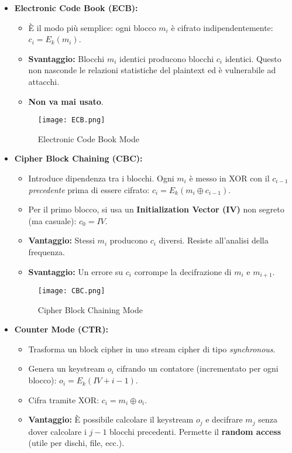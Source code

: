\documentclass[../main.tex]{subfiles}
\begin{document}
\begin{itemize}
    \item \textbf{Electronic Code Book (ECB):}
          \begin{itemize}
              \item È il modo più semplice: ogni blocco $m_i$ è cifrato indipendentemente: $c_i = E_k(m_i)$.
              \item \textbf{Svantaggio:} Blocchi $m_i$ identici producono blocchi $c_i$ identici. Questo non nasconde le relazioni statistiche del plaintext ed è vulnerabile ad attacchi.
              \item \textbf{Non va mai usato}.
          \end{itemize}
          
    \begin{figure}[H]
      \centering
      \texttt{[image: ECB.png]}
      \caption{Electronic Code Book Mode}
      \label{fig:etichetta}
    \end{figure}
     
    \item \textbf{Cipher Block Chaining (CBC):}
          \begin{itemize}
              \item Introduce dipendenza tra i blocchi. Ogni $m_i$ è messo in XOR con il $c_{i-1}$ \emph{precedente} prima di essere cifrato: $c_i = E_k(m_i \oplus c_{i-1})$.
              \item Per il primo blocco, si usa un \textbf{Initialization Vector (IV)} non segreto (ma casuale): $c_0 = IV$.
              \item \textbf{Vantaggio:} Stessi $m_i$ producono $c_i$ diversi. Resiste all'analisi della frequenza.
              \item \textbf{Svantaggio:} Un errore su $c_i$ corrompe la decifrazione di $m_i$ e $m_{i+1}$.
          \end{itemize}
          
    \begin{figure}[H]
      \centering
      \texttt{[image: CBC.png]}
      \caption{Cipher Block Chaining Mode}
      \label{fig:etichetta}
    \end{figure}
          
    \item \textbf{Counter Mode (CTR):}
          \begin{itemize}
              \item Trasforma un block cipher in uno stream cipher di tipo \emph{synchronous}.
              \item Genera un keystream $o_i$ cifrando un contatore (incrementato per ogni blocco): $o_i = E_k(IV + i - 1)$.
              \item Cifra tramite XOR: $c_i = m_i \oplus o_i$.
              \item \textbf{Vantaggio:} È possibile calcolare il keystream $o_j$ e decifrare $m_j$ senza dover calcolare i $j-1$ blocchi precedenti. Permette il \textbf{random access} (utile per dischi, file, ecc.).
          \end{itemize}
          

\end{itemize}
\end{document}
